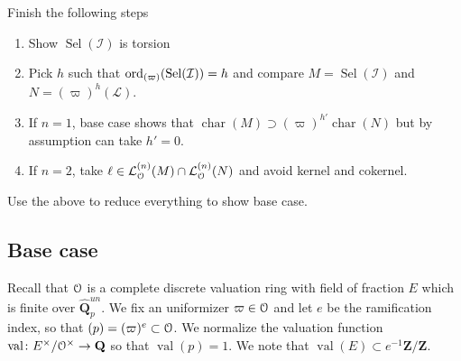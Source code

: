 \documentclass[leqno]{amsart}
\theoremstyle{definition}
\theoremstyle{remark}
\newcommand{\eo}{\EuScript{O}}
\newcommand{\Q}{{\mathbf{Q}}}
\newcommand{\Z}{{\mathbf{Z}}}
\DeclareMathOperator{\val}{val} %
\newcommand{\I}{\mathcal{I}} %
\newcommand{\ord}{\textnormal{ord}} %
\DeclareMathOperator{\Sel}{Sel}
\DeclareMathOperator{\car}{char}
\newcommand{\lin}[1]{\mathcal{L}^{(#1)}}
\begin{document}
Finish the following steps
\begin{enumerate}
\item Show $\Sel(\I)$ is torsion
\item Pick $h$ such that 
$\ord_{(\varpi)}(\Sel(\I))=h$
and compare
$M=\Sel(\I)$ and $N=(\varpi)^h(\mathcal{L})$.
\item If $n=1$, base case shows that
$\car(M)\supset (\varpi)^{h'}\car(N)$
but by assumption can take $h'=0$.
\item If $n=2$, take 
$\ell\in \lin{n}_{\eo}(M)\cap \lin{n}_{\eo}(N)$
and avoid kernel and cokernel.
\end{enumerate}
Use the above to reduce everything to show base case.


\subsection{Base case}

Recall that $\eo$ is a complete discrete valuation ring
with field of fraction $E$ which is finite over $\widehat{\Q}_p^{un}$.
We fix an uniformizer $\varpi\in\eo$
and let $e$ be the ramification index,
so that $(p)=(\varpi)^e\subset \eo$.
We normalize the valuation function
$\val\colon E^\times/\eo^\times\to \Q$
so that $\val(p)=1$.
We note that $\val(E)\subset e^{-1}\Z/\Z$.
\end{document}
